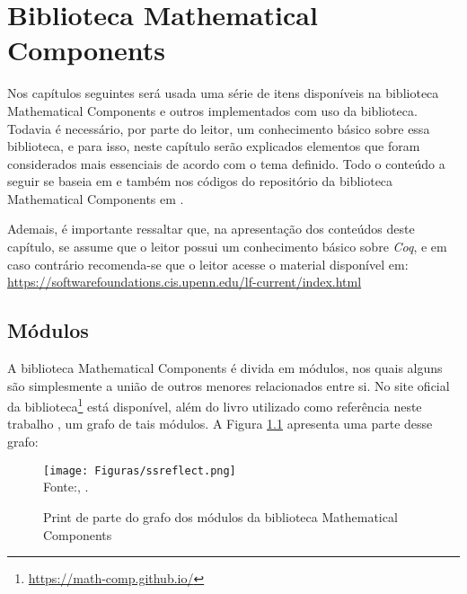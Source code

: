 \chapter{Biblioteca Mathematical Components}
\label{cap:mathcomp}

Nos capítulos seguintes será usada uma série de itens disponíveis na biblioteca Mathematical Components e outros implementados com uso da biblioteca. Todavia é necessário, por parte do leitor, um conhecimento básico sobre essa biblioteca, e para isso, neste capítulo serão explicados elementos que foram considerados mais essenciais de acordo com o tema definido. Todo o conteúdo a seguir se baseia em \cite{assia_mahboubi_2022_7118596} e também nos códigos do repositório da biblioteca Mathematical Components em \cite{mathcomp-github}.

Ademais, é importante ressaltar que, na apresentação dos conteúdos deste capítulo, se assume que o leitor possui um conhecimento básico sobre \textit{Coq}, e em caso contrário recomenda-se que o leitor acesse o material disponível em: \url{https://softwarefoundations.cis.upenn.edu/lf-current/index.html}

\section{Módulos}
A biblioteca Mathematical Components é divida em módulos, nos quais alguns são simplesmente a união de outros menores relacionados entre si. No site oficial da biblioteca\footnote{\url{https://math-comp.github.io/}} está disponível, além do livro utilizado como referência neste trabalho \cite{assia_mahboubi_2022_7118596}, um grafo
de tais módulos. A Figura \ref{fig:graph-mathcomp} apresenta uma parte desse grafo:

\begin{figure}[h]
    \centering
    \caption{Print de parte do grafo dos módulos da biblioteca Mathematical Components}
    \texttt{[image: Figuras/ssreflect.png]}\\
    \footnotesize{Fonte:\citeauthor{grafo-ssreflect}, \citeyear{grafo-ssreflect}.
    }
    \label{fig:graph-mathcomp}
\end{figure}


